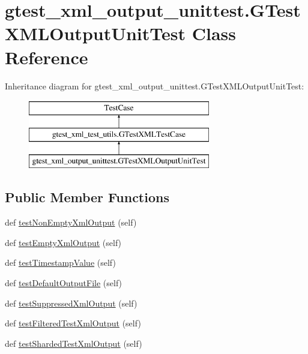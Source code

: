 \hypertarget{classgtest__xml__output__unittest_1_1_g_test_x_m_l_output_unit_test}{}\section{gtest\+\_\+xml\+\_\+output\+\_\+unittest.\+G\+Test\+X\+M\+L\+Output\+Unit\+Test Class Reference}
\label{classgtest__xml__output__unittest_1_1_g_test_x_m_l_output_unit_test}
Inheritance diagram for gtest\+\_\+xml\+\_\+output\+\_\+unittest.\+G\+Test\+X\+M\+L\+Output\+Unit\+Test\+:\begin{figure}[H]
\begin{center}
\leavevmode
\includegraphics[height=3.000000cm]{d7/d74/classgtest__xml__output__unittest_1_1_g_test_x_m_l_output_unit_test}
\end{center}
\end{figure}
\subsection*{Public Member Functions}
\begin{DoxyCompactItemize}
\item 
def \mbox{\hyperlink{classgtest__xml__output__unittest_1_1_g_test_x_m_l_output_unit_test_a310c136c1eb2b421f57651a7d358b17a}{test\+Non\+Empty\+Xml\+Output}} (self)
\item 
def \mbox{\hyperlink{classgtest__xml__output__unittest_1_1_g_test_x_m_l_output_unit_test_a9602f91fe2e9d1e09171a032e94a5619}{test\+Empty\+Xml\+Output}} (self)
\item 
def \mbox{\hyperlink{classgtest__xml__output__unittest_1_1_g_test_x_m_l_output_unit_test_a828521a7ae57f650e1e9ca4beb34336a}{test\+Timestamp\+Value}} (self)
\item 
def \mbox{\hyperlink{classgtest__xml__output__unittest_1_1_g_test_x_m_l_output_unit_test_a01ca66e14468028e5c4eb809987113cf}{test\+Default\+Output\+File}} (self)
\item 
def \mbox{\hyperlink{classgtest__xml__output__unittest_1_1_g_test_x_m_l_output_unit_test_ac6df46d6831892e4c14dbdfae0049618}{test\+Suppressed\+Xml\+Output}} (self)
\item 
def \mbox{\hyperlink{classgtest__xml__output__unittest_1_1_g_test_x_m_l_output_unit_test_a572b6d49e8f4d646ebdadcced3d260ef}{test\+Filtered\+Test\+Xml\+Output}} (self)
\item 
def \mbox{\hyperlink{classgtest__xml__output__unittest_1_1_g_test_x_m_l_output_unit_test_adc6a611bd7c433ecd84876dcb2ac1df1}{test\+Sharded\+Test\+Xml\+Output}} (self)
\end{DoxyCompactItemize}
